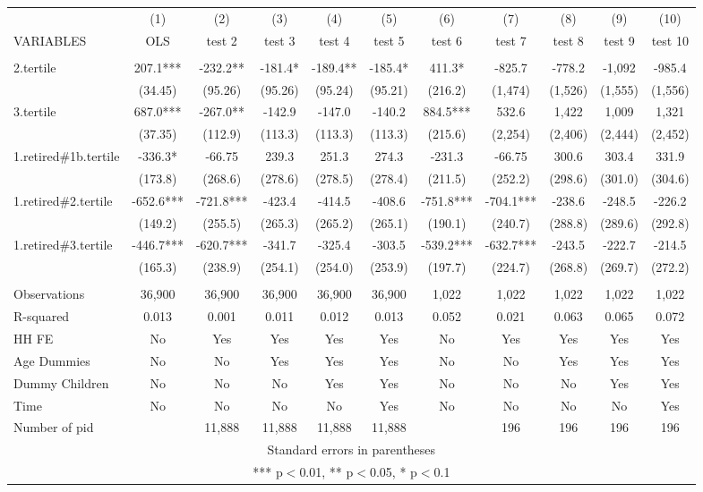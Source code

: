 \begin{tabular}{lcccccccccc} \hline
 & (1) & (2) & (3) & (4) & (5) & (6) & (7) & (8) & (9) & (10) \\
VARIABLES & OLS & test 2 & test 3 & test 4 & test 5 & test 6 & test 7 & test 8 & test 9 & test 10 \\ \hline
 &  &  &  &  &  &  &  &  &  &  \\
2.tertile & 207.1*** & -232.2** & -181.4* & -189.4** & -185.4* & 411.3* & -825.7 & -778.2 & -1,092 & -985.4 \\
 & (34.45) & (95.26) & (95.26) & (95.24) & (95.21) & (216.2) & (1,474) & (1,526) & (1,555) & (1,556) \\
3.tertile & 687.0*** & -267.0** & -142.9 & -147.0 & -140.2 & 884.5*** & 532.6 & 1,422 & 1,009 & 1,321 \\
 & (37.35) & (112.9) & (113.3) & (113.3) & (113.3) & (215.6) & (2,254) & (2,406) & (2,444) & (2,452) \\
1.retired\#1b.tertile & -336.3* & -66.75 & 239.3 & 251.3 & 274.3 & -231.3 & -66.75 & 300.6 & 303.4 & 331.9 \\
 & (173.8) & (268.6) & (278.6) & (278.5) & (278.4) & (211.5) & (252.2) & (298.6) & (301.0) & (304.6) \\
1.retired\#2.tertile & -652.6*** & -721.8*** & -423.4 & -414.5 & -408.6 & -751.8*** & -704.1*** & -238.6 & -248.5 & -226.2 \\
 & (149.2) & (255.5) & (265.3) & (265.2) & (265.1) & (190.1) & (240.7) & (288.8) & (289.6) & (292.8) \\
1.retired\#3.tertile & -446.7*** & -620.7*** & -341.7 & -325.4 & -303.5 & -539.2*** & -632.7*** & -243.5 & -222.7 & -214.5 \\
 & (165.3) & (238.9) & (254.1) & (254.0) & (253.9) & (197.7) & (224.7) & (268.8) & (269.7) & (272.2) \\
 &  &  &  &  &  &  &  &  &  &  \\
Observations & 36,900 & 36,900 & 36,900 & 36,900 & 36,900 & 1,022 & 1,022 & 1,022 & 1,022 & 1,022 \\
R-squared & 0.013 & 0.001 & 0.011 & 0.012 & 0.013 & 0.052 & 0.021 & 0.063 & 0.065 & 0.072 \\
HH FE & No & Yes & Yes & Yes & Yes & No & Yes & Yes & Yes & Yes \\
Age Dummies & No & No & Yes & Yes & Yes & No & No & Yes & Yes & Yes \\
Dummy Children & No & No & No & Yes & Yes & No & No & No & Yes & Yes \\
Time & No & No & No & No & Yes & No & No & No & No & Yes \\
 Number of pid &  & 11,888 & 11,888 & 11,888 & 11,888 &  & 196 & 196 & 196 & 196 \\ \hline
\multicolumn{11}{c}{ Standard errors in parentheses} \\
\multicolumn{11}{c}{ *** p$<$0.01, ** p$<$0.05, * p$<$0.1} \\
\end{tabular}
